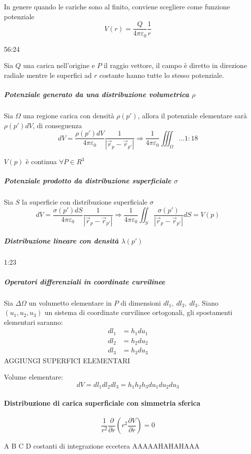 In genere quando le cariche sono al finito, conviene scegliere come funzione potenziale
$$
V(r) = \frac{Q}{4 \pi \varepsilon_0}\frac{1}{r}
$$

56:24

Sia $Q$ una carica nell'origine e $P$ il raggio vettore, il campo è diretto in direzione radiale
mentre le superfici ad $r$ costante hanno tutte lo stesso potenziale.

\subparagraph{Potenziale generato da una distribuzione volumetrica $\rho$}
Sia $\Omega$ una regione carica con densità $\rho(p')$, allora il potenziale elementare sarà
$\rho(p')dV$, di conseguenza
$$
dV = \frac{\rho(p')dV}{4\pi\varepsilon_0}\frac{1}{|\vec{r}_p - \vec{r}_{p'}|} \Rightarrow
\frac{1}{4\pi\varepsilon_0} \iiint_\Omega ... 1:18
$$

$V(p)$ è continua $\forall P \in R^3$

\subparagraph{Potenziale prodotto da distribuzione superficiale $\sigma$}
Sia $S$ la superficie con distribuzione superficiale $\sigma$
$$
dV = \frac{\sigma(p')dS}{4\pi\varepsilon_0} \frac{1}{|\vec{r}_p - \vec{r}_{p'}|} \Rightarrow
\frac{1}{4\pi\varepsilon_0} \iint_S \frac{\sigma(p')}{|\vec{r}_p - \vec{r}_{p'}|} dS = V(p)
$$

\subparagraph{Distribuzione lineare con densità $\lambda(p')$}
1:23

\subparagraph{Operatori differenziali in coordinate curvilinee}
Sia $\Delta\Omega$ un volumetto elementare in $P$ di dimensioni $dl_1,\ dl_2,\ dl_3$.
Siano $(u_1,u_2,u_3)$ un sistema di coordinate curvilinee ortogonali, gli spostamenti elementari
saranno:
\begin{align*}
dl_1 &= h_1du_1\\
dl_2 &= h_2du_2\\
dl_3 &= h_3du_3
\end{align*}
AGGIUNGI SUPERFICI ELEMENTARI

Volume elementare:
$$
dV = dl_1dl_2dl_3 = h_1h_2h_3du_1du_2du_3
$$






\paragraph{Distribuzione di carica superficiale con simmetria sferica}
$$
\frac{1}{r^2}\frac{\partial}{\partial r} \left(r^2 \frac{\partial V}{\partial r}\right) = 0
$$

A B C D costanti di integrazione eccetera AAAAAHAHAHAAA

